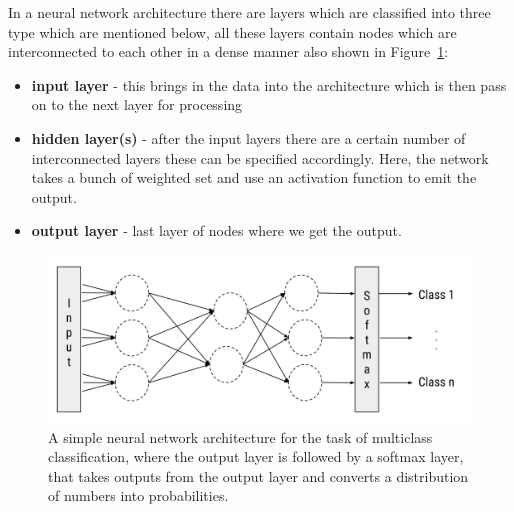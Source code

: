 In a neural network architecture there are layers which are classified into three type which are mentioned below, all these layers contain nodes which are interconnected to each other in a dense manner also shown in Figure~\ref{fig:nn}:
\begin{itemize}
    \item \textbf{input layer} - this brings in the data into the architecture which is then pass on to the next layer for processing
    \item \textbf{hidden layer(s)} - after the input layers there are a certain number of interconnected layers these can be specified accordingly. Here, the network takes a bunch of weighted set and use an activation function to emit the output.
    \item \textbf{output layer} - last layer of nodes where we get the output.
\end{itemize}
\begin{figure}[!htb]
    \centering
    \includegraphics[scale=0.6]{Figures/neural-network.png}
    \caption{A simple neural network architecture for the task of multiclass classification, where the output layer is followed by a softmax layer, that takes outputs from the output layer and converts a distribution of numbers into probabilities.}
    \label{fig:nn}
\end{figure}

